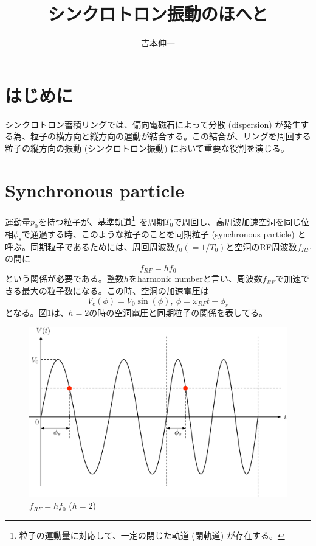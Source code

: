 \documentclass[10pt,a4paper]{ltjsarticle}
\begin{document}
\title{シンクロトロン振動のほへと}
\author{吉本伸一}
\maketitle
\tableofcontents
\clearpage

\section{はじめに}
シンクロトロン蓄積リングでは、偏向電磁石によって分散 (dispersion) が発生する為、粒子の横方向と縦方向の運動が結合する。この結合が、リングを周回する粒子の縦方向の振動 (シンクロトロン振動) において重要な役割を演じる。

\section{Synchronous particle}
運動量$p_0$を持つ粒子が、基準軌道\footnote{粒子の運動量に対応して、一定の閉じた軌道 (閉軌道) が存在する。}\ を周期$T_0$で周回し、高周波加速空洞を同じ位相$\phi_s$で通過する時、このような粒子のことを同期粒子 (synchronous particle) と呼ぶ。同期粒子であるためには、周回周波数$f_0 (= 1/T_0)$と空洞のRF周波数$f_{RF}$の間に
%
\begin{equation}
    f_{RF} = h f_0
    \label{harmonic}
\end{equation}
%
という関係が必要である。整数$h$をharmonic numberと言い、周波数$f_{RF}$で加速できる最大の粒子数になる。この時、空洞の加速電圧は
%
\begin{equation}
    V_c (\phi) = V_0 \sin (\phi),\:\phi = \omega_{RF} t + \phi_s
\end{equation}
%
となる。図\ref{synchronous}は、$h=2$の時の空洞電圧と同期粒子の関係を表してる。

\begin{figure}[hbt]
    \begin{center}
      \includegraphics[width=15cm,clip]{figs/synchronous.pdf}
      \caption{$f_{RF} = h f_0$ ($h=2$)}
      \label{synchronous}
    \end{center}
\end{figure}
\end{document}
